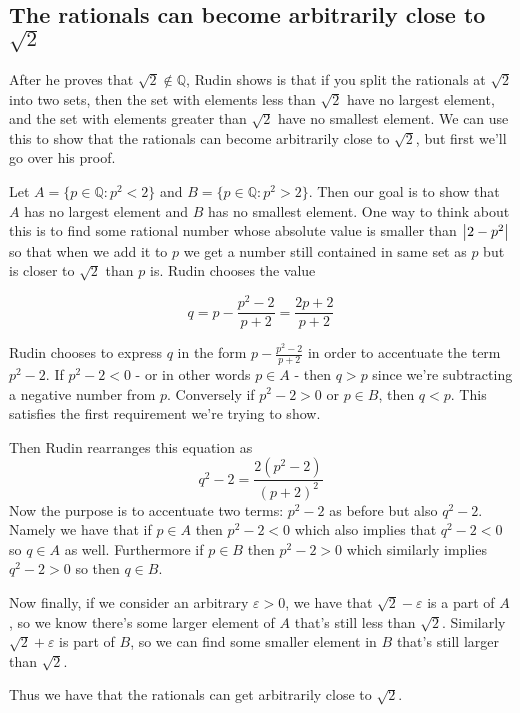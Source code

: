 \documentclass{article}
\newcommand{\Q}{\mathbb{Q}}
\let\endoldproof\endproof
\renewenvironment{proof}[1][\proofname]
  {\begin{adjustwidth}{2em}{2em}
   \oldproof[#1]}
  {\endoldproof
   \end{adjustwidth}}
\begin{document}
\newpage
\subsection*{The rationals can become arbitrarily close to $\sqrt{2}$}
\begin{proof}
After he proves that $\sqrt{2} \not\in \Q$, Rudin shows is that if you split
the rationals at $\sqrt{2}$ into two sets, then the set with elements less than
$\sqrt{2}$ have no largest element, and the set with elements greater than
$\sqrt{2}$ have no smallest element. We can use this to show that the
rationals can become arbitrarily  close to $\sqrt{2}$, but first we'll go over
his proof.

Let $A = \{p \in \Q : p^2 < 2\}$ and $B = \{p \in \Q : p^2 > 2\}$. Then our
goal is to show that $A$ has no largest element and $B$ has no smallest element.
One way to think about this is to find some rational number whose absolute
value is smaller than $\abs{2-p^2}$ so that when we add it to $p$ we get a
number still contained in same set as $p$ but is closer to $\sqrt{2}$ than $p$
is. Rudin chooses the value

\begin{equation*}
q = p - \frac{p^2-2}{p+2} = \frac{2p+2}{p+2}
\end{equation*}

Rudin chooses to express $q$ in the form $p - \frac{p^2-2}{p+2}$ in order to
accentuate the term $p^2 - 2$. If $p^2-2 < 0$ - or in other words $p \in A$ -
then $q > p$ since we're subtracting a negative number from $p$. Conversely if
$p^2-2 > 0$ or $p \in B$, then $q < p$. This satisfies the first requirement
we're trying to show.

Then Rudin rearranges this equation as
\begin{equation*}
q^2-2 = \frac{2(p^2-2)}{(p+2)^2}
\end{equation*}
Now the purpose is to accentuate two terms: $p^2-2$ as before but also $q^2-2$.
Namely we have that if $p\in A$ then $p^2-2 < 0$ which also implies that
$q^2-2 <0$ so $q\in A$ as well. Furthermore if $p\in B$ then $p^2-2 > 0$ which
similarly implies $q^2-2 > 0$ so then $q\in B$.

Now finally, if we consider an arbitrary $\varepsilon > 0$, we have that
$\sqrt{2} - \varepsilon$ is a part of $A$, so we know there's some larger
element of $A$ that's still less than $\sqrt{2}$. Similarly $\sqrt{2} +
\varepsilon$ is part of $B$, so we can find some smaller element in $B$ that's
still larger than $\sqrt{2}$.

Thus we have that the rationals can get arbitrarily close to $\sqrt{2}$.
\end{proof}
\end{document}
